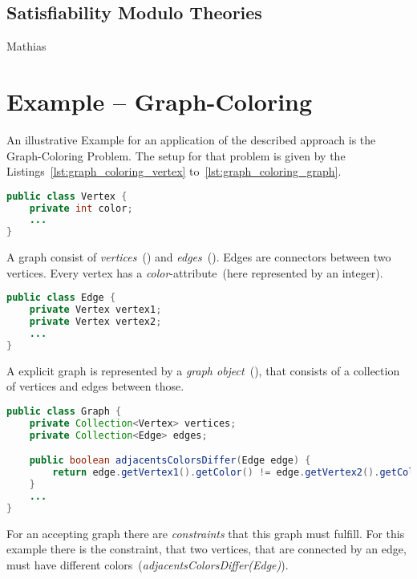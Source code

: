 \documentclass[conference]{IEEEtran}
\begin{document}
\subsection{Satisfiability Modulo Theories}
\label{sec:prelim_smt}

\danger Mathias

\section{Example -- Graph-Coloring}
\label{sec:example}

An illustrative Example for an application of the described approach is the
Graph-Coloring Problem. The setup for that problem is given by the
Listings~\ref{lst:graph_coloring_vertex} to~\ref{lst:graph_coloring_graph}.

\begin{lstlisting}[language=java,label=lst:graph_coloring_vertex,
    caption=Example -- Vertex]
public class Vertex {
	private int color;
	...
}
\end{lstlisting}

A graph consist of \emph{vertices}~() and
\emph{edges}~(). Edges are connectors
between two vertices. Every vertex has a \emph{color}-attribute~(here
represented by an integer).

\begin{lstlisting}[language=java,label=lst:graph_coloring_edge,
    caption=Example -- Edge]
public class Edge {
    private Vertex vertex1;
    private Vertex vertex2;
    ...
}
\end{lstlisting}

A explicit graph is represented by a
\emph{graph object}~(), that consists of a
collection of vertices and edges between those.

\begin{lstlisting}[language=java,label=lst:graph_coloring_graph,
  caption=Example -- Graph]
public class Graph {
    private Collection<Vertex> vertices;
    private Collection<Edge> edges;

    public boolean adjacentsColorsDiffer(Edge edge) {
        return edge.getVertex1().getColor() != edge.getVertex2().getColor();
    }
    ...
}
\end{lstlisting}

For an accepting graph there are \emph{constraints} that this graph must
fulfill. For this example there is the constraint, that two vertices, that are
connected by an edge, must have different
colors~(\emph{adjacentsColorsDiffer(Edge)}).
\end{document}
